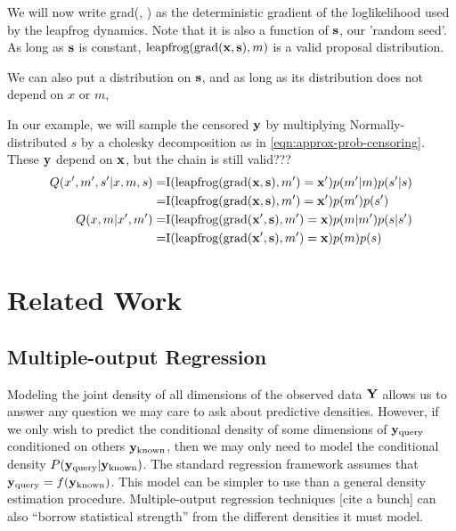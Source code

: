\documentclass{article}
\begin{document}
We will now write \textrm{grad}(\vx, \vs) as the deterministic gradient of the loglikelihood used by the leapfrog dynamics.  Note that it is also a function of ${\bf{s}}$, our 'random seed'.  As long as ${\bf{s}}$ is constant, $\textrm{leapfrog}( \textrm{grad}({\bf{x}}, {\bf{s}}), m)$ is a valid proposal distribution.

We can also put a distribution on ${\bf{s}}$, and as long as its distribution does not depend on $x$ or $m$, 

In our example, we will sample the censored ${\bf{y}}$ by multiplying Normally-distributed $s$ by a cholesky decomposition as in \eqref{eqn:approx-prob-censoring}.  These ${\bf{y}}$ depend on ${\bf{x}}$, but the chain is still valid???
%
\begin{align}
Q( x', m', s'| x, m, s ) = & \textrm{I}( \textrm{leapfrog}( \textrm{grad}({\bf{x}}, {\bf{s}}), m') = {\bf{x}}' )p(m'|m)p(s'|s) \\
= & \textrm{I}( \textrm{leapfrog}( \textrm{grad}({\bf{x}}, {\bf{s}}), m') = {\bf{x}}' )p(m') p(s')\\
Q( x, m | x', m' ) = & \textrm{I}( \textrm{leapfrog}( \textrm{grad}({\bf{x}}', {\bf{s}}), m') = {\bf{x}} )p(m|m')p(s|s') \\
= & \textrm{I}( \textrm{leapfrog}( \textrm{grad}({\bf{x}}', {\bf{s}}), m') = {\bf{x}} )p(m) p(s) \\
\end{align}

\section{Related Work}

\subsection{Multiple-output Regression}

Modeling the joint density of all dimensions of the observed data $\mathbf{Y}$ allows us to answer any question we may care to ask about predictive densities.  However, if we only wish to predict the conditional density of some dimensions of ${\bf{y}}_{\textrm{query}}$ conditioned on others ${\bf{y}}_{\textrm{known}}$, then we may only need to model the conditional density $P( {\bf{y}}_{\textrm{query}} | {\bf{y}}_{\textrm{known}})$.  The standard regression framework assumes that ${\bf{y}}_{\textrm{query}} = f({\bf{y}}_{\textrm{known}})$.  This model can be simpler to use than a general density estimation procedure.  Multiple-output regression techniques [cite a bunch] can also ``borrow statistical strength'' from the different densities it must model.
\end{document}
